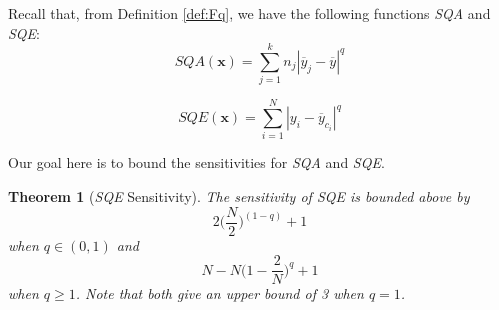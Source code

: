 \documentclass[USenglish,oneside]{article}
\newcounter{ab}
\newcounter{igh}
\newtheorem{theorem}{Theorem}
\newcommand{\dbsize}{\ensuremath{N}\xspace}
\newcommand{\sqa}{\textit{SQA}\xspace}
\newcommand{\sqe}{\textit{SQE}\xspace}
\newcommand{\x}{\ensuremath{\mathbf{x}}\xspace}
\begin{document}
Recall that, from Definition \ref{def:Fq}, we have the following functions \sqa and \sqe:
\begin{equation*}
\sqa(\x) = \sum_{j=1}^k n_j \left\vert \overline{y}_j - \overline{y} \right\vert^q
\end{equation*}

\begin{equation*}
\sqe(\x) = \sum_{i=1}^N \left\vert y_i - \overline{y}_{c_i} \right\vert^q
\end{equation*}

\noindent Our goal here is to bound the sensitivities for \sqa and \sqe.

\setcounter{theorem}{6}
\begin{theorem}[\sqe Sensitivity]  \label{thm:SQEsens-appendix} 
The sensitivity of \sqe is bounded above by
\begin{equation*}
2\bigg(\frac{\dbsize}{2}\bigg)^{(1-q)} + 1
\end{equation*}
when $q \in (0,1)$ and
\begin{equation*}
\dbsize - \dbsize\bigg(1-\frac{2}{\dbsize}\bigg)^q +1 
\end{equation*}
when $q\geq 1$. Note that both give an upper bound of 3 when $q=1$.
\end{theorem}
\end{document}
